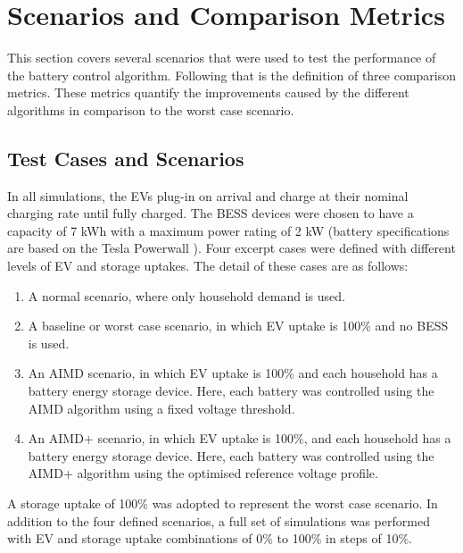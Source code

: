 \section{Scenarios and Comparison Metrics}
\label{ch4:sec:scenarios-and-comparison-metrics}

This section covers several scenarios that were used to test the performance of the battery control algorithm.
Following that is the definition of three comparison metrics.
These metrics quantify the improvements caused by the different algorithms in comparison to the worst case scenario.

\subsection{Test Cases and Scenarios}
\label{ch4:subsec:test-cases-and-scenarios}

In all simulations, the EVs plug-in on arrival and charge at their nominal charging rate until fully charged. The BESS devices were chosen to have a capacity of 7 kWh with a maximum power rating of 2 kW (battery specifications are based on the Tesla Powerwall \cite{Powerwall2015}).
Four excerpt cases were defined with different levels of EV and storage uptakes.
The detail of these cases are as follows:

\begin{enumerate}[
labelindent=*,
style=multiline,
leftmargin=*,
label=\textbf{Case \Alph*}
]
\item \label{ch4:case-a}
A normal scenario, where only household demand is used.
\item \label{ch4:case-b}
A baseline or worst case scenario, in which EV uptake is 100\% and no BESS is used.
\item \label{ch4:case-c}
An AIMD scenario, in which EV uptake is 100\% and each household has a battery energy storage device.
Here, each battery was controlled using the AIMD algorithm using a fixed voltage threshold.
\item \label{ch4:case-d}
An AIMD+ scenario, in which EV uptake is 100\%, and each household has a battery energy storage device.
Here, each battery was controlled using the AIMD+ algorithm using the optimised reference voltage profile.
\end{enumerate}

A storage uptake of 100\% was adopted to represent the worst case scenario.
In addition to the four defined scenarios, a full set of simulations was performed with EV and storage uptake combinations of 0\% to 100\% in steps of 10\%.


